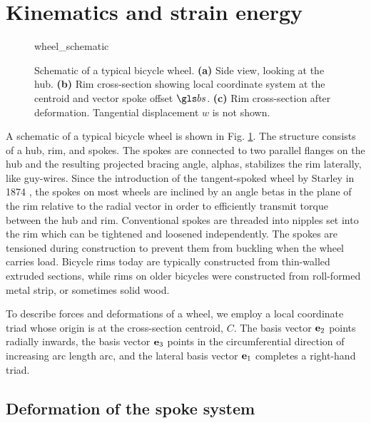 \documentclass[\rootdir/thesis.tex]{subfiles}
\begin{document}
\section{Kinematics and strain energy}

\begin{figure}[b]
\centering
{wheel_schematic}
\caption[Schematic of a typical bicycle wheel]{Schematic of a typical bicycle wheel. \textbf{(a)} Side view, looking at the hub. \textbf{(b)} Rim cross-section showing local coordinate system at the centroid and vector spoke offset $\bs$. \textbf{(c)} Rim cross-section after deformation. Tangential displacement $w$ is not shown.}
\label{fig:wheel_schematic}
\end{figure}

A schematic of a typical bicycle wheel is shown in Fig. \ref{fig:wheel_schematic}. The structure consists of a hub, rim, and spokes. The spokes are connected to two parallel flanges on the hub and the resulting projected bracing angle, \gls{alphas}, stabilizes the rim laterally, like guy-wires. Since the introduction of the tangent-spoked wheel by Starley in 1874 \cite{Hadland2014}, the spokes on most wheels are inclined by an angle \gls{betas} in the plane of the rim relative to the radial vector in order to efficiently transmit torque between the hub and rim. Conventional spokes are threaded into nipples set into the rim which can be tightened and loosened independently. The spokes are tensioned during construction to prevent them from buckling when the wheel carries load. Bicycle rims today are typically constructed from thin-walled extruded sections, while rims on older bicycles were constructed from roll-formed metal strip, or sometimes solid wood.

To describe forces and deformations of a wheel, we employ a local coordinate triad whose origin is at the cross-section centroid, $C$. The basis vector $\mathbf{e}_2$ points radially inwards, the basis vector $\mathbf{e}_3$ points in the circumferential direction of increasing arc length \gls{arc}, and the lateral basis vector $\mathbf{e}_1$ completes a right-hand triad.



\subsection{Deformation of the spoke system}

\end{document}

